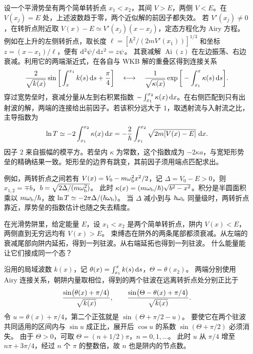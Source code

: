 设一个平滑势垒有两个简单转折点 $x_1 < x_2$，其间 $V > E$，两侧 $V < E$。在 $V(x_j) = E$ 处，上述波数趋于零，两个近似解的前因子都失效。
若 $V'(x_j) \ne 0$，在转折点附近取 $V(x) - E \simeq V'(x_j)(x - x_j)$，定态方程化为 Airy 方程。
例如在上升的左侧转折点，取长度 $\ell = [\hbar^2/(2mV'(x_1))]^{1/3}$ 和坐标 $z = (x - x_1)/\ell$，便有 $\mathop{}\!\mathrm{d}^2\psi/\mathop{}\!\mathrm{d} z^2 = z\psi$。
其衰减解 $\operatorname{Ai}(z)$ 在左边振荡、右边衰减。利用它的两端渐近式，在各自与 WKB 解的重叠区得到连接关系
\begin{equation}\label{eq:qm-wkb-connection}
    \frac{2}{\sqrt{k(x)}}\sin\bigg[\int_x^{x_1}k(s)\mathop{}\!\mathrm{d} s + \frac\pi4\bigg]
    \quad \longleftrightarrow \quad
    \frac{1}{\sqrt{\kappa(x)}}\exp\bigg[-\int_{x_1}^{x}\kappa(s)\mathop{}\!\mathrm{d} s\bigg].
\end{equation}
穿过宽势垒时，衰减分量从左到右积累指数 $\textstyle -\int_{x_1}^{x_2}\kappa(x)\mathop{}\!\mathrm{d} x$。在右侧匹配到只有出射波的解，两端的连接给出前因子。若该积分远大于 $1$，取透射流与入射流之比，主导指数为
\begin{equation}
    \ln T \simeq -2\int_{x_1}^{x_2}\kappa(x)\mathop{}\!\mathrm{d} x
       = -\frac{2}{\hbar}\int_{x_1}^{x_2}\sqrt{2m[V(x) - E]}\,\mathop{}\!\mathrm{d} x .
    \label{eq:qm-wkb-barrier}
\end{equation}
因子 $2$ 来自振幅的模平方。若垒内 $\kappa$ 为常数，这个指数成为 $-2\kappa a$，与宽矩形势垒的精确结果一致。矩形垒的边界有跳变，其前因子须用端点匹配求出。

例如，两转折点之间若有 $V(x) = V_0 - m\omega_{\mathrm{b}}^2x^2/2$，记 $\Delta = V_0 - E > 0$，则 $x_{1,2} = \mp b$，$b = \sqrt{2\Delta/(m\omega_{\mathrm{b}}^2)}$。
此时 $\kappa(x) = (m\omega_{\mathrm{b}}/\hbar)\sqrt{b^2 - x^2}$。积分是半圆面积乘以 $m\omega_{\mathrm{b}}/\hbar$，故 $\ln T \simeq -2\pi\Delta/(\hbar\omega_{\mathrm{b}})$。
当 $\Delta$ 减小到与 $\hbar\omega_{\mathrm{b}}$ 同量级时，两转折点靠近，厚势垒的指数估计也随之失去精度。

\label{ss:qm-wkb-bound}

在光滑势阱里，给定能量 $E$，设 $x_1 < x_2$ 是两个简单转折点，阱内 $V(x) < E$，两侧直到无穷远均有 $V(x) > E$。
束缚态在阱外的两条尾部都须衰减。从左端的衰减尾部向阱内延拓，得到一列驻波。从右端延拓也得到一列驻波。
什么能量能让它们接成同一个态？

沿用的局域波数 $k(x)$，记 $\textstyle \theta(x) = \int_{x_1}^x k(s)\mathop{}\!\mathrm{d} s$，$\Theta = \theta(x_2)$。
两端分别使用 Airy 连接关系，朝阱内量取相位，得到的两个驻波在远离转折点处分别正比于
\[
    \frac{\sin\bigl(\theta(x) + \pi/4\bigr)}{\sqrt{k(x)}},
    \qquad
    \frac{\sin\bigl(\Theta - \theta(x) + \pi/4\bigr)}{\sqrt{k(x)}} .
\]
令 $u = \theta(x) + \pi/4$，第二个正弦就是 $\sin(\Theta + \pi/2 - u)$。
要使它在两个驻波共同适用的区间内与 $\sin u$ 成正比，展开后 $\cos u$ 的系数 $\sin(\Theta + \pi/2)$ 必须消失。
由于 $\Theta > 0$，可取 $\Theta = (n + 1/2)\pi$，$n = 0,1,\ldots$。
此时 $u$ 从 $\pi/4$ 增至 $n\pi + 3\pi/4$，经过 $n$ 个 $\pi$ 的整数倍，故 $n$ 也是阱内的节点数。

